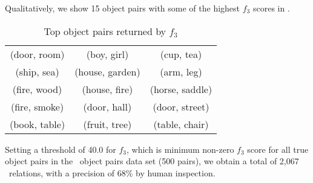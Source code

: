 Qualitatively, we show 15 object pairs with some of the highest $f_3$ scores
in .

\begin{table}[th]
	\centering
	\begin{tabular}{|ccc|}
		\hline
		(door, room)  & (boy, girl)     & (cup, tea)      \\
		(ship, sea)   & (house, garden) & (arm, leg)      \\
		(fire, wood)  & (house, fire)   & (horse, saddle) \\
		(fire, smoke) & (door, hall)    & (door, street)  \\
		(book, table) & (fruit, tree)   & (table, chair)  \\ \hline
	\end{tabular}
	\caption{Top object pairs returned by $f_3$}
	\label{tbl:toppairs}
\end{table}

Setting a threshold of 40.0 for $f_3$, which is minimum non-zero
$f_3$ score for all true object pairs in the \lnear\ object pairs 
data set (500 pairs), we obtain a total of 2,067 \lnear\ relations, with
a precision of 68\% by human inspection.


